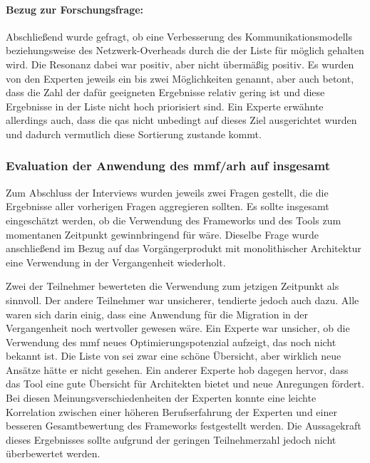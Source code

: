 \paragraph{Bezug zur Forschungsfrage:} Abschließend wurde gefragt, ob eine Verbesserung des Kom\-mu\-ni\-ka\-ti\-ons\-mo\-dells beziehungsweise des Netzwerk-Overheads durch die \bpp der Liste für möglich gehalten wird.
Die Resonanz dabei war positiv, aber nicht übermäßig positiv.
Es wurden von den Experten jeweils ein bis zwei Möglichkeiten genannt, aber auch betont, dass die Zahl der dafür geeigneten Ergebnisse relativ gering ist und diese Ergebnisse in der Liste nicht hoch priorisiert sind.
Ein Experte erwähnte allerdings auch, dass die \glspl{qa} nicht unbedingt auf dieses Ziel ausgerichtet wurden und dadurch vermutlich diese Sortierung zustande kommt.

\subsubsection{Evaluation der Anwendung des \gls{mmf}/\gls{arh} auf \jf insgesamt}
\label{sec:evaluation-mmf-anwendung-insgesamt}

Zum Abschluss der Interviews wurden jeweils zwei Fragen gestellt, die die Ergebnisse aller vor\-he\-ri\-gen Fragen aggregieren sollten.
Es sollte insgesamt eingeschätzt werden, ob die Verwendung des Frameworks und des Tools zum momentanen Zeitpunkt gewinnbringend für \jf wäre.
Dieselbe Frage wurde anschließend im Bezug auf das Vorgängerprodukt mit monolithischer Architektur eine Verwendung in der Vergangenheit wiederholt.

Zwei der Teilnehmer bewerteten die Verwendung zum jetzigen Zeitpunkt als sinnvoll.
Der andere Teilnehmer war unsicherer, tendierte jedoch auch dazu.
Alle waren sich darin einig, dass eine Anwendung für die Migration in der Vergangenheit noch wertvoller gewesen wäre.
Ein Experte war unsicher, ob die Verwendung des \gls{mmf} neues Optimierungspotenzial aufzeigt, das noch nicht bekannt ist.
Die Liste von \bpp sei zwar eine schöne Übersicht, aber wirklich neue Ansätze hätte er nicht gesehen.
Ein anderer Experte hob dagegen hervor, dass das Tool eine gute Übersicht für Architekten bietet und neue Anregungen fördert.
Bei diesen Meinungsverschiedenheiten der Experten konnte eine leichte Korrelation zwischen einer höheren Berufserfahrung der Experten und einer besseren Gesamtbewertung des Frameworks festgestellt werden.
Die Aussagekraft dieses Ergebnisses sollte aufgrund der geringen Teilnehmerzahl jedoch nicht überbewertet werden.

